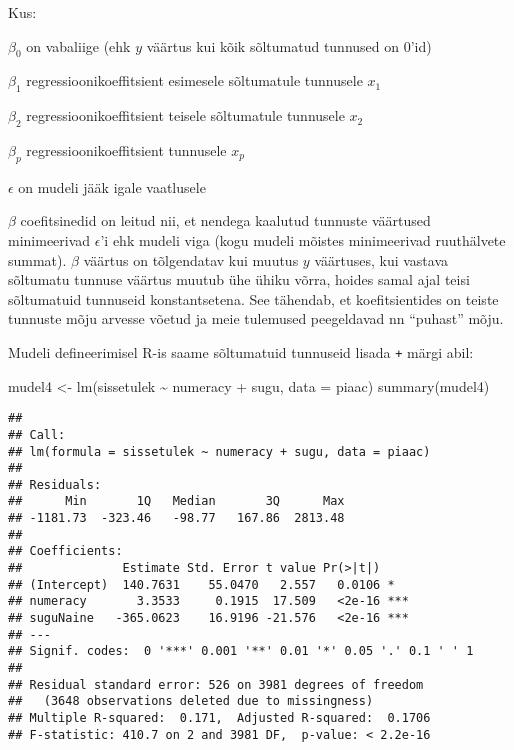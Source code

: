 \documentclass[
]{book}
\newenvironment{Shaded}{\begin{snugshade}}{\end{snugshade}}
\newcommand{\AttributeTok}[1]{\textcolor[rgb]{0.77,0.63,0.00}{#1}}
\newcommand{\FunctionTok}[1]{\textcolor[rgb]{0.00,0.00,0.00}{#1}}
\newcommand{\NormalTok}[1]{#1}
\newcommand{\OtherTok}[1]{\textcolor[rgb]{0.56,0.35,0.01}{#1}}
\newcommand{\SpecialCharTok}[1]{\textcolor[rgb]{0.00,0.00,0.00}{#1}}
\begin{document}
Kus:

\(\beta_0\) on vabaliige (ehk \(y\) väärtus kui kõik sõltumatud tunnused on \(0\)'id)

\(\beta_1\) regressioonikoeffitsient esimesele sõltumatule tunnusele \(x_1\)

\(\beta_2\) regressioonikoeffitsient teisele sõltumatule tunnusele \(x_2\)

\(\beta_{p}\) regressioonikoeffitsient tunnusele \(x_{p}\)

\(\epsilon\) on mudeli jääk igale vaatlusele

\(\beta\) coefitsinedid on leitud nii, et nendega kaalutud tunnuste väärtused minimeerivad \(\epsilon\)'i ehk mudeli viga (kogu mudeli mõistes minimeerivad ruuthälvete summat). \(\beta\) väärtus on tõlgendatav kui muutus \(y\) väärtuses, kui vastava sõltumatu tunnuse väärtus muutub ühe ühiku võrra, hoides samal ajal teisi sõltumatuid tunnuseid konstantsetena. See tähendab, et koefitsientides on teiste tunnuste mõju arvesse võetud ja meie tulemused peegeldavad nn ``puhast'' mõju.

Mudeli defineerimisel R-is saame sõltumatuid tunnuseid lisada \texttt{+} märgi abil:

\begin{Shaded}
\begin{Highlighting}[]
\NormalTok{mudel4 }\OtherTok{\textless{}{-}} \FunctionTok{lm}\NormalTok{(sissetulek }\SpecialCharTok{\textasciitilde{}}\NormalTok{ numeracy }\SpecialCharTok{+}\NormalTok{ sugu, }\AttributeTok{data =}\NormalTok{ piaac)}
\FunctionTok{summary}\NormalTok{(mudel4)}
\end{Highlighting}
\end{Shaded}

\begin{verbatim}
## 
## Call:
## lm(formula = sissetulek ~ numeracy + sugu, data = piaac)
## 
## Residuals:
##      Min       1Q   Median       3Q      Max 
## -1181.73  -323.46   -98.77   167.86  2813.48 
## 
## Coefficients:
##              Estimate Std. Error t value Pr(>|t|)    
## (Intercept)  140.7631    55.0470   2.557   0.0106 *  
## numeracy       3.3533     0.1915  17.509   <2e-16 ***
## suguNaine   -365.0623    16.9196 -21.576   <2e-16 ***
## ---
## Signif. codes:  0 '***' 0.001 '**' 0.01 '*' 0.05 '.' 0.1 ' ' 1
## 
## Residual standard error: 526 on 3981 degrees of freedom
##   (3648 observations deleted due to missingness)
## Multiple R-squared:  0.171,  Adjusted R-squared:  0.1706 
## F-statistic: 410.7 on 2 and 3981 DF,  p-value: < 2.2e-16
\end{verbatim}
\end{document}
